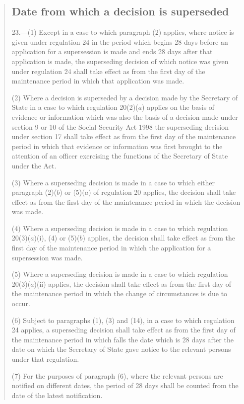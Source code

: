 \documentclass[12pt,a4paper]{article}
\begin{document}
\begin{quotation}
\subsection*{Date from which a decision is superseded}

23.—(1) Except in a case to which paragraph (2) applies, where notice is given under regulation 24 in the period which begins 28 days before an application for a supersession is made and ends 28 days after that application is made, the superseding decision of which notice was given under regulation 24 shall take effect as from the first day of the maintenance period in which that application was made.

(2) Where a decision is superseded by a decision made by the Secretary of State in a case to which regulation 20(2)($a$) applies on the basis of evidence or information which was also the basis of a decision made under section 9 or 10 of the Social Security Act 1998 the superseding decision under section 17 shall take effect as from the first day of the maintenance period in which that evidence or information was first brought to the attention of an officer exercising the functions of the Secretary of State under the Act.

(3) Where a superseding decision is made in a case to which either paragraph (2)($b$) or (5)($a$) of regulation 20 applies, the decision shall take effect as from the first day of the maintenance period in which the decision was made.

(4) Where a superseding decision is made in a case to which regulation 20(3)($a$)(i), (4) or (5)($b$) applies, the decision shall take effect as from the first day of the maintenance period in which the application for a supersession was made.

(5) Where a superseding decision is made in a case to which regulation 20(3)($a$)(ii) applies, the decision shall take effect as from the first day of the maintenance period in which the change of circumstances is due to occur.

(6) Subject to paragraphs (1), (3) and (14), in a case to which regulation 24 applies, a superseding decision shall take effect as from the first day of the maintenance period in which falls the date which is 28 days after the date on which the Secretary of State gave notice to the relevant persons under that regulation.

(7) For the purposes of paragraph (6), where the relevant persons are notified on different dates, the period of 28 days shall be counted from the date of the latest notification.


\end{quotation}
\end{document}
